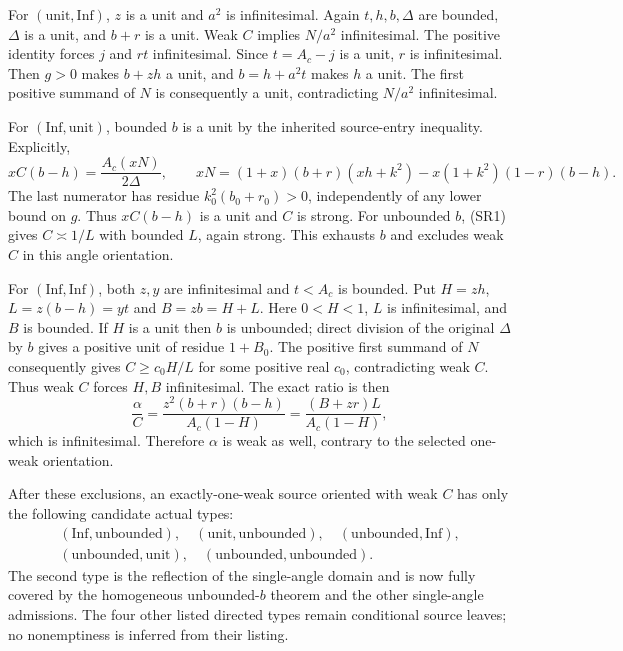For $(\mathrm{unit},\mathrm{Inf})$, $z$ is a unit and $a^2$ is
infinitesimal. Again $t,h,b,\Delta$ are bounded, $\Delta$ is a unit,
and $b+r$ is a unit. Weak $C$ implies $N/a^2$ infinitesimal.
The positive identity forces $j$ and $rt$ infinitesimal. Since
$t=A_c-j$ is a unit, $r$ is infinitesimal. Then $g>0$ makes
$b+zh$ a unit, and $b=h+a^2t$ makes $h$ a unit. The first positive
summand of $N$ is consequently a unit, contradicting $N/a^2$
infinitesimal.

For $(\mathrm{Inf},\mathrm{unit})$, bounded $b$ is a unit by the
inherited source-entry inequality. Explicitly,
\[
 xC(b-h)=\frac{A_c(xN)}{2\Delta},\qquad
 xN=(1+x)(b+r)(xh+k^2)-x(1+k^2)(1-r)(b-h).
\]
The last numerator has residue $k_0^2(b_0+r_0)>0$, independently
of any lower bound on $g$. Thus $xC(b-h)$ is a unit and $C$ is strong. For unbounded
$b$, (SR1) gives $C\asymp1/L$ with bounded $L$, again strong.
This exhausts $b$ and excludes weak $C$ in this angle orientation.

For $(\mathrm{Inf},\mathrm{Inf})$, both $z,y$ are infinitesimal
and $t<A_c$ is bounded. Put $H=zh$, $L=z(b-h)=yt$ and $B=zb=H+L$.
Here $0<H<1$, $L$ is infinitesimal, and $B$ is bounded. If $H$ is
a unit then $b$ is unbounded; direct division of the original
$\Delta$ by $b$ gives a positive unit of residue $1+B_0$.
The positive first summand of $N$ consequently gives
$C\ge c_0H/L$ for some positive real $c_0$, contradicting weak $C$.
Thus weak $C$ forces $H,B$ infinitesimal. The exact ratio is then
\[
 \frac\alpha C=
 \frac{z^2(b+r)(b-h)}{A_c(1-H)}
 =\frac{(B+zr)L}{A_c(1-H)},
\]
which is infinitesimal. Therefore $\alpha$ is weak as well, contrary
to the selected one-weak orientation.

After these exclusions, an exactly-one-weak source oriented with weak
$C$ has only the following candidate actual types:
\begin{gather*}
 (\mathrm{Inf},\mathrm{unbounded}),\quad
 (\mathrm{unit},\mathrm{unbounded}),\quad
 (\mathrm{unbounded},\mathrm{Inf}),\\
 (\mathrm{unbounded},\mathrm{unit}),\quad
 (\mathrm{unbounded},\mathrm{unbounded}).
\end{gather*}
The second type is the reflection of the single-angle domain and
is now fully covered by the homogeneous unbounded-$b$ theorem and the
other single-angle admissions. The four other listed directed types
remain conditional source leaves; no nonemptiness is inferred from
their listing.

